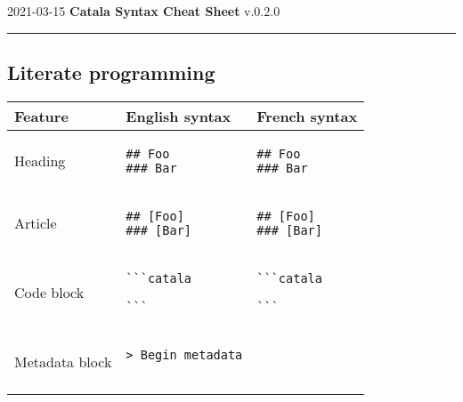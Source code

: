 \documentclass[a3paper,landscape]{article}
\begin{document}
\begin{center}
2021-03-15
\hfill
{\Huge\bfseries\sffamily
Catala Syntax Cheat Sheet}
\hfill
v.0.2.0
\end{center}
\hrule

\begin{multicols*}{2}





\section*{Literate programming}
\begin{center}
\begin{tabular}{p{}p{}p{}}
\toprule
Feature&English syntax&French syntax\\\midrule
Heading&
\vspace*{-1.75em}
\begin{verbatim}
## Foo
### Bar
\end{verbatim}
\vspace*{-1.75em}
&
\vspace*{-1.75em}
\begin{verbatim}
## Foo
### Bar
\end{verbatim}
\vspace*{-1.75em}
\\
Article&
\vspace*{-1.75em}
\begin{verbatim}
## [Foo]
### [Bar]
\end{verbatim}
\vspace*{-1.75em}
&
\vspace*{-1.75em}
\begin{verbatim}
## [Foo]
### [Bar]
\end{verbatim}
\vspace*{-1.75em}
\\
Code block&
\vspace*{-1.75em}
\begin{verbatim}
```catala

```
\end{verbatim}
\vspace*{-1.75em}
&
\vspace*{-1.75em}
\begin{verbatim}
```catala

```
\end{verbatim}
\vspace*{-1.75em}
\\
Metadata block&
\vspace*{-1.75em}
\begin{verbatim}
> Begin metadata


\end{verbatim}
\end{tabular}
\end{center}
\end{multicols*}
\end{document}
